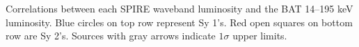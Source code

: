 Correlations between each SPIRE waveband luminosity and the BAT 14--195 keV luminosity. Blue circles on top row represent Sy 1's. Red open squares on bottom row are Sy 2's. Sources with gray arrows indicate $1\sigma$ upper limits.\label{fig:lum_spire_BAT}
